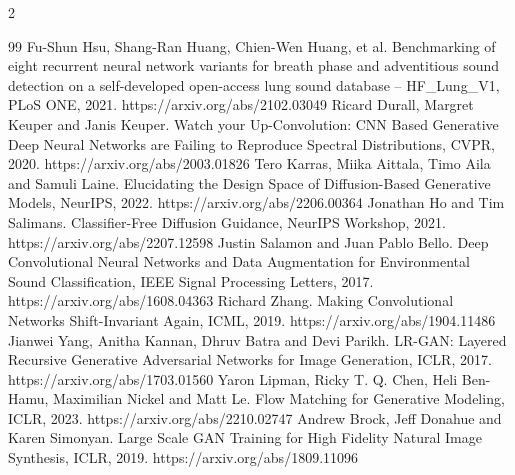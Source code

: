 \documentclass[twoside,english]{article}
\begin{document}
\vspace{-1mm}
\renewcommand{\refname}{\normalsize References}
{\scriptsize
\setlength{\columnsep}{10pt}\begin{multicols}{2}
\begin{thebibliography}{99}\setlength{\itemsep}{0pt}\setlength{\parskip}{0pt}
 Fu-Shun Hsu, Shang-Ran Huang, Chien-Wen Huang, et al. Benchmarking of eight recurrent neural network variants for breath phase and adventitious sound detection on a self-developed open-access lung sound database -- HF\_Lung\_V1, PLoS ONE, 2021. https://arxiv.org/abs/2102.03049
 Ricard Durall, Margret Keuper and Janis Keuper. Watch your Up-Convolution: CNN Based Generative Deep Neural Networks are Failing to Reproduce Spectral Distributions, CVPR, 2020. https://arxiv.org/abs/2003.01826
 Tero Karras, Miika Aittala, Timo Aila and Samuli Laine. Elucidating the Design Space of Diffusion-Based Generative Models, NeurIPS, 2022. https://arxiv.org/abs/2206.00364
 Jonathan Ho and Tim Salimans. Classifier-Free Diffusion Guidance, NeurIPS Workshop, 2021. https://arxiv.org/abs/2207.12598
 Justin Salamon and Juan Pablo Bello. Deep Convolutional Neural Networks and Data Augmentation for Environmental Sound Classification, IEEE Signal Processing Letters, 2017. https://arxiv.org/abs/1608.04363
 Richard Zhang. Making Convolutional Networks Shift-Invariant Again, ICML, 2019. https://arxiv.org/abs/1904.11486
 Jianwei Yang, Anitha Kannan, Dhruv Batra and Devi Parikh. LR-GAN: Layered Recursive Generative Adversarial Networks for Image Generation, ICLR, 2017. https://arxiv.org/abs/1703.01560
 Yaron Lipman, Ricky T. Q. Chen, Heli Ben-Hamu, Maximilian Nickel and Matt Le. Flow Matching for Generative Modeling, ICLR, 2023. https://arxiv.org/abs/2210.02747
 Andrew Brock, Jeff Donahue and Karen Simonyan. Large Scale GAN Training for High Fidelity Natural Image Synthesis, ICLR, 2019. https://arxiv.org/abs/1809.11096
\end{thebibliography}
\end{multicols}}
\end{document}
